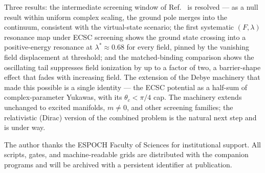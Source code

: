 \documentclass[aps,pre,twocolumn,superscriptaddress,floatfix,longbibliography]{revtex4-2}
\begin{document}
Three results: the intermediate screening window of
Ref.~\cite{JiaoHo2021} is resolved --- as a null result within
uniform complex scaling, the ground pole merges into the continuum,
consistent with the virtual-state scenario; the first systematic
$(F,\lambda)$ resonance map under ECSC screening shows the ground
state crossing into a positive-energy resonance at
$\lambda^{*}\approx0.68$ for every field, pinned by the vanishing
field displacement at threshold; and the matched-binding
comparison shows the oscillating tail suppresses field ionization
by up to a factor of two, a barrier-shape effect that fades with
increasing field. The extension of the Debye machinery that made
this possible is a single identity --- the ECSC potential as a
half-sum of complex-parameter Yukawas, with its $\theta_c<\pi/4$
cap. The machinery extends unchanged to excited manifolds,
$m\neq0$, and other screening families; the relativistic (Dirac)
version of the combined problem is the natural next step and is
under way.

\begin{acknowledgments}
The author thanks the ESPOCH Faculty of Sciences for institutional
support. All scripts, gates, and machine-readable grids are
distributed with the companion programs and will be archived with a
persistent identifier at publication.
\end{acknowledgments}


\end{document}
